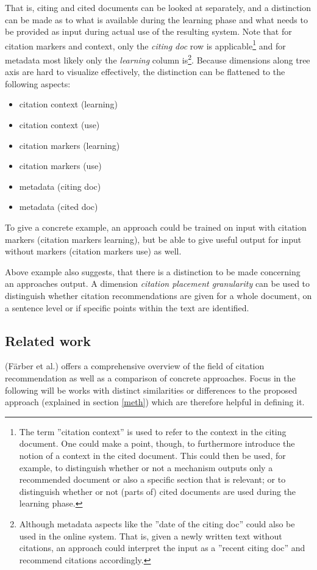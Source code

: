 \documentclass{proseminar}
\begin{document}
That is, citing and cited documents can be looked at separately, and a distinction can be made as to what is available during the learning phase and what needs to be provided as input during actual use of the resulting system. Note that for citation markers and context, only the \emph{citing doc} row is applicable\footnote{The term ''citation context'' is used to refer to the context in the citing document. One could make a point, though, to furthermore introduce the notion of a context in the cited document. This could then be used, for example, to distinguish whether or not a mechanism outputs only a recommended document or also a specific section that is relevant; or to distinguish whether or not (parts of) cited documents are used during the learning phase.} and for metadata most likely only the \emph{learning} column is\footnote{Although metadata aspects like the ''date of the citing doc'' could also be used in the online system. That is, given a newly written text without citations, an approach could interpret the input as a ''recent citing doc'' and recommend citations accordingly.}. Because dimensions along tree axis are hard to visualize effectively, the distinction can be flattened to the following aspects:

\begin{itemize}
    \item citation context (learning)
    \item citation context (use)
    \item citation markers (learning)
    \item citation markers (use)
    \item metadata (citing doc)
    \item metadata (cited doc)
\end{itemize}

To give a concrete example, an approach could be trained on input with citation markers (citation markers learning),  but be able to give useful output for input without markers (citation markers use) as well.

Above example also suggests, that there is a distinction to be made concerning an approaches output. A dimension \emph{citation placement granularity} can be used to distinguish whether citation recommendations are given for a whole document, on a sentence level or if specific points within the text are identified.

\subsection{Related work}
\cite{Faerber} (F\"arber et al.) offers a comprehensive overview of the field of citation recommendation as well as a comparison of concrete approaches. Focus in the following will be works with distinct similarities or differences to the proposed approach (explained in section \ref{meth}) which are therefore helpful in defining it.
\end{document}

